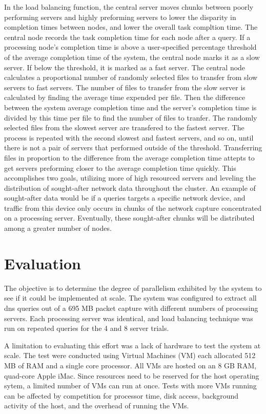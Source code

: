 \documentclass{article}
\begin{document}
\begin{multicols}{2}
In the load balancing function, the central server moves chunks between poorly performing servers and highly preforming servers to lower the disparity in completion times between nodes, and lower the overall task compltion time.  The central node records the task completion time for each node after a query.  If a processing node's completion time is above a user-specified percentage threshold of the average completion time of the system, the central node marks it as a slow server. If below the threshold, it is marked as a fast server.  The central node calculates a proportional number of randomly selected files to transfer from slow servers to fast servers. The number of files to transfer from the slow server is calculated by finding the average time expended per file.  Then the difference between the system average completion time and the server's completion time is divided by this time per file to find the number of files to tranfer. The randomly selected files from the slowest server are transfered to the fastest server.  The process is repeated with the second slowest and fastest servers, and so on, until there is not a pair of servers that performed outside of the threshold.  Transferring files in proportion to the difference from the average completion time attepts to get servers preforming closer to the average completion time quickly.  This accomplishes two goals, utilizing more of high resourced servers and leveling the distribution of sought-after network data throughout the cluster.  An example of sought-after data would be if a queries targets a specific network device, and traffic from this device only occurs in chunks of the network capture concentrated on a processing server.  Eventually, these sought-after chunks will be distributed among a greater number of nodes. 

\section*{Evaluation} 


The objective is to determine the degree of parallelism exhibited by the system to see if it could be implemented at scale. The system was configured to extract all dns queries out of a 695 MB packet capture with different numbers of processing servers.  Each processing server was identical, and load balancing technique was run on repeated queries for the 4 and 8 server trials. 

A limitation to evaluating this effort was a lack of hardware to test the system at scale. The test were conducted using Virtual Machines (VM) each allocated 512 MB of RAM and a single core processor.  All VMs are hosted on an 8 GB RAM, quad-core Apple iMac. Since resources need to be reserved for the host operating sytem, a limited number of VMs can run at once.  Tests with more VMs running can be affected by competition for processor time, disk access, background activity of the host, and the overhead of running the VMs.


\end{multicols}
\end{document}
